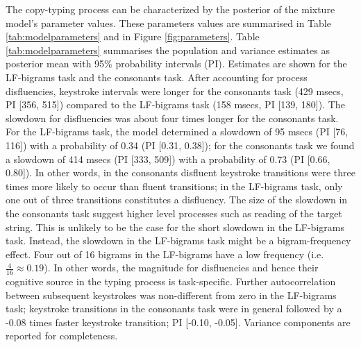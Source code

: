\documentclass[
  english,
  man,mask,floatsintext]{apa7}
\begin{document}
The copy-typing process can be characterized by the posterior of the mixture model's parameter values. These parameters values are summarised in Table \ref{tab:modelparameters} and in Figure \ref{fig:parameters}. Table \ref{tab:modelparameters} summarises the population and variance estimates as posterior mean with 95\% probability intervals (PI). Estimates are shown for the LF-bigrams task and the consonants task. After accounting for process disfluencies, keystroke intervals were longer for the consonants task (429 msecs, PI {[}356, 515{]}) compared to the LF-bigrams task (158 msecs, PI {[}139, 180{]}). The slowdown for disfluencies was about four times longer for the consonants task. For the LF-bigrams task, the model determined a slowdown of 95 msecs (PI {[}76, 116{]}) with a probability of 0.34 (PI {[}0.31, 0.38{]}); for the consonants task we found a slowdown of 414 msecs (PI {[}333, 509{]}) with a probability of 0.73 (PI {[}0.66, 0.80{]}). In other words, in the consonants disfluent keystroke transitions were three times more likely to occur than fluent transitions; in the LF-bigrams task, only one out of three transitions constitutes a disfluency. The size of the slowdown in the consonants task suggest higher level processes such as reading of the target string. This is unlikely to be the case for the short slowdown in the LF-bigrams task. Instead, the slowdown in the LF-bigrams task might be a bigram-frequency effect. Four out of 16 bigrams in the LF-bigrams have a low frequency (i.e.~\(\frac{4}{16}\approx0.19\)). In other words, the magnitude for disfluencies and hence their cognitive source in the typing process is task-specific. Further autocorrelation between subsequent keystrokes was non-different from zero in the LF-bigrams task; keystroke transitions in the consonants task were in general followed by a -0.08 times faster keystroke transition; PI {[}-0.10, -0.05{]}. Variance components are reported for completeness.
\end{document}
